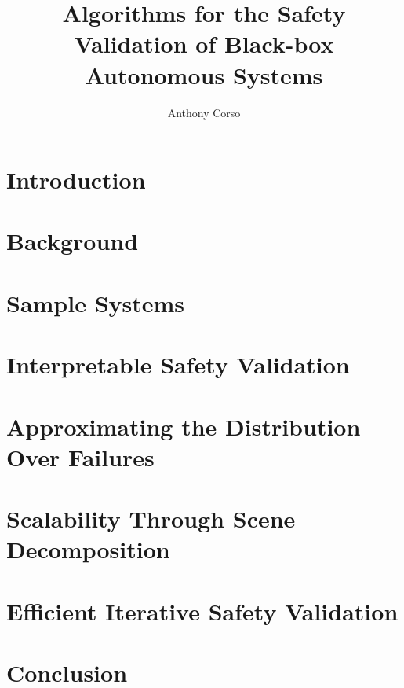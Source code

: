 \documentclass[12pt,letterpaper]{report}
\title{Algorithms for the Safety Validation of Black-box Autonomous Systems}
\author{Anthony Corso}
\begin{document}
\beforepreface






\afterpreface

\chapter{Introduction}


\chapter{Background}


\chapter{Sample Systems}
\label{ch3}


\chapter{Interpretable Safety Validation}


\chapter{Approximating the Distribution Over Failures}


\chapter{Scalability Through Scene Decomposition}


\chapter{Efficient Iterative Safety Validation}


\chapter{Conclusion}


\printbibliography
\end{document}

